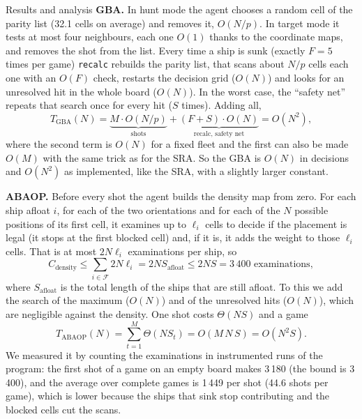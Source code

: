\documentclass[letterpaper,11pt]{article} %
\begin{document}
\begin{Resultados}{Results and analysis}
\textbf{GBA.} In hunt mode the agent chooses a random cell of the parity list (32.1 cells on average) and removes it, $O(N/p)$. In target mode it tests at most four neighbours, each one $O(1)$ thanks to the coordinate maps, and removes the shot from the list. Every time a ship is sunk (exactly $F=5$ times per game) \texttt{recalc} rebuilds the parity list, that scans about $N/p$ cells each one with an $O(F)$ check, restarts the decision grid ($O(N)$) and looks for an unresolved hit in the whole board ($O(N)$). In the worst case, the ``safety net'' repeats that search once for every hit ($S$ times). Adding all,
\begin{equation}
    T_{\text{GBA}}(N)=\underbrace{M\cdot O(N/p)}_{\text{shots}}+\underbrace{(F+S)\cdot O(N)}_{\text{recalc, safety net}}=O(N^2),
\end{equation}
where the second term is $O(N)$ for a fixed fleet and the first can also be made $O(M)$ with the same trick as for the SRA. So the GBA is $O(N)$ in decisions and $O(N^2)$ as implemented, like the SRA, with a slightly larger constant.

\textbf{ABAOP.} Before every shot the agent builds the density map from zero. For each ship afloat $i$, for each of the two orientations and for each of the $N$ possible positions of its first cell, it examines up to $\ell_i$ cells to decide if the placement is legal (it stops at the first blocked cell) and, if it is, it adds the weight to those $\ell_i$ cells. That is at most $2N\ell_i$ examinations per ship, so
\begin{equation}
    C_{\text{density}}\le\sum_{i\in\mathcal F}2N\ell_i=2NS_{\text{afloat}}\le 2NS=3\,400 \text{ examinations},
\end{equation}
where $S_{\text{afloat}}$ is the total length of the ships that are still afloat. To this we add the search of the maximum ($O(N)$) and of the unresolved hits ($O(N)$), which are negligible against the density. One shot costs $\Theta(NS)$ and a game
\begin{equation}
    T_{\text{ABAOP}}(N)=\sum_{t=1}^{M}\Theta(NS_t)=O(M\,N\,S)=O(N^2S).
\end{equation}
We measured it by counting the examinations in instrumented runs of the program: the first shot of a game on an empty board makes 3\,180 (the bound is 3\,400), and the average over complete games is 1\,449 per shot (44.6 shots per game), which is lower because the ships that sink stop contributing and the blocked cells cut the scans.


\end{Resultados}
\end{document}
